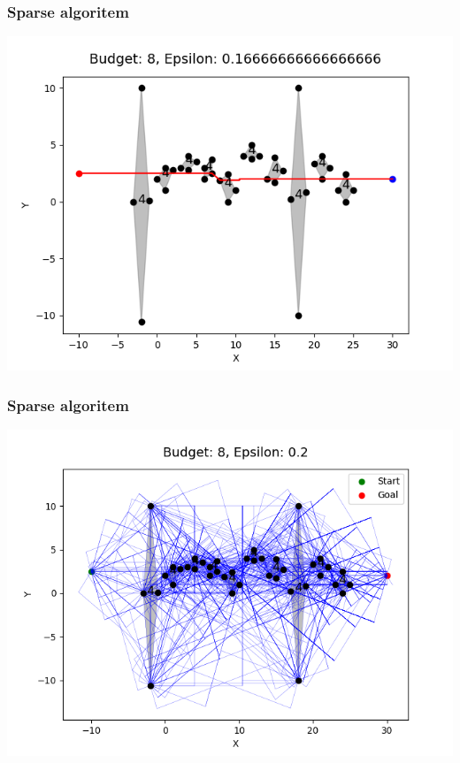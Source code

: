 \documentclass{beamer}
\begin{document}
\begin{frame}
    \frametitle{Sparse algoritem}

    \includegraphics[width=1\textwidth]{pr4_6.png}
\end{frame}

\begin{frame}
    \frametitle{Sparse algoritem}

    \includegraphics[width=1\textwidth]{pr4ViaGraph.png}

\end{frame}
\end{document}
